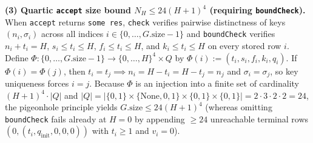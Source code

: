 \documentclass[11pt,letterpaper]{article}
\begin{document}
\textbf{(3) Quartic \texttt{accept} size bound \(N_H \le 24(H+1)^4\)
(requiring \texttt{boundCheck}).} When \texttt{accept} returns
\texttt{some\ res}, \texttt{check} verifies pairwise distinctness of
keys \((n_i, \sigma_i)\) across all indices
\(i \in \{0, \dots, G.\mathrm{size} - 1\}\) and \texttt{boundCheck}
verifies \(n_i + t_i = H\), \(s_i \le t_i \le H\),
\(f_i \le t_i \le H\), and \(k_i \le t_i \le H\) on every stored row
\(i\). Define
\(\Phi: \{0, \dots, G.\mathrm{size} - 1\} \to \{0, \dots, H\}^4 \times Q\)
by \(\Phi(i) := (t_i, s_i, f_i, k_i, q_i)\). If \(\Phi(i) = \Phi(j)\),
then \(t_i = t_j \implies n_i = H - t_i = H - t_j = n_j\) and
\(\sigma_i = \sigma_j\), so key uniqueness forces \(i = j\). Because
\(\Phi\) is an injection into a finite set of cardinality
\((H + 1)^4 \cdot |Q|\) and
\(|Q| = |\{0,1\} \times \{\mathrm{None},0,1\} \times \{0,1\} \times \{0,1\}| = 2 \cdot 3 \cdot 2 \cdot 2 = 24\),
the pigeonhole principle yields \(G.\mathrm{size} \le 24(H + 1)^4\)
(whereas omitting \texttt{boundCheck} fails already at \(H = 0\) by
appending \(\ge 24\) unreachable terminal rows
\((0, (t_i, q_{\mathrm{init}}, 0, 0, 0))\) with \(t_i \ge 1\) and
\(v_i = 0\)).
\end{document}
